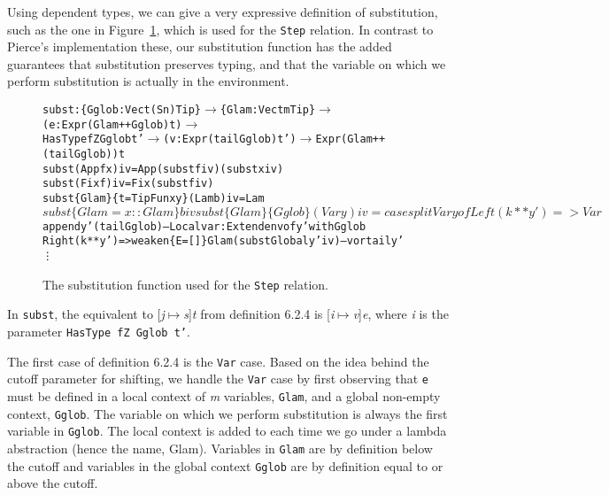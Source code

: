 Using dependent types, we can give a very expressive definition of substitution, such as the one in Figure~\ref{fig:subst}, which is used for the \texttt{Step} relation. In contrast to Pierce's implementation these, our substitution function has the added guarantees that substitution preserves typing, and that the variable on which we perform substitution is actually in the environment.  

\begin{figure}
\begin{alltt}
subst : \{Gglob : Vect (S n) Tip\} \(\rightarrow\) \{Glam: Vect m Tip\} \(\rightarrow\) (e: Expr (Glam ++ Gglob) t)\(\rightarrow\) 
        HasType fZ Gglob t' \(\rightarrow\) (v: Expr (tail Gglob) t') \(\rightarrow\) Expr (Glam ++ (tail Gglob)) t
subst                     (App f x) i v = App (subst f i v) (subst x i v)
subst                       (Fix f) i v = Fix (subst f i v)
subst \{Glam\} \{t=TipFun x y\} (Lam b) i v = Lam $ subst \{Glam = x :: Glam\} b i v
subst \{Glam\} \{Gglob\}        (Var y) i v = 
  case splitVar y of
   Left (k ** y')  => Var $ append y' (tail Gglob) -- Local var: Extend env of y' with Gglob
   Right (k ** y') => weaken \{E=[]\} Glam (substGlobal y' i v) -- v or tail y'
\vdots
\end{alltt}
\caption{The substitution function used for the \texttt{Step} relation.}
\label{fig:subst}
\end{figure}

In \texttt{subst}, the equivalent to [\textit{j}$\mapsto$\textit{s}]\textit{t} from definition 6.2.4 is [\textit{i}$\mapsto$\textit{v}]\textit{e}, where \textit{i} is the parameter \texttt{HasType fZ Gglob t'}.


The first case of definition 6.2.4 is the \texttt{Var} case. Based on the idea behind the cutoff parameter for shifting, we handle the \texttt{Var} case by first observing that \texttt{e} must be defined in a local context of \textit{m} variables, \texttt{Glam}, and a global non-empty context, \texttt{Gglob}. The variable on which we perform substitution is always the first variable in \texttt{Gglob}. The local context is added to each time we go under a lambda abstraction (hence the name, Glam). Variables in \texttt{Glam} are by definition below the cutoff and variables in the global context \texttt{Gglob} are by definition equal to or above the cutoff.

